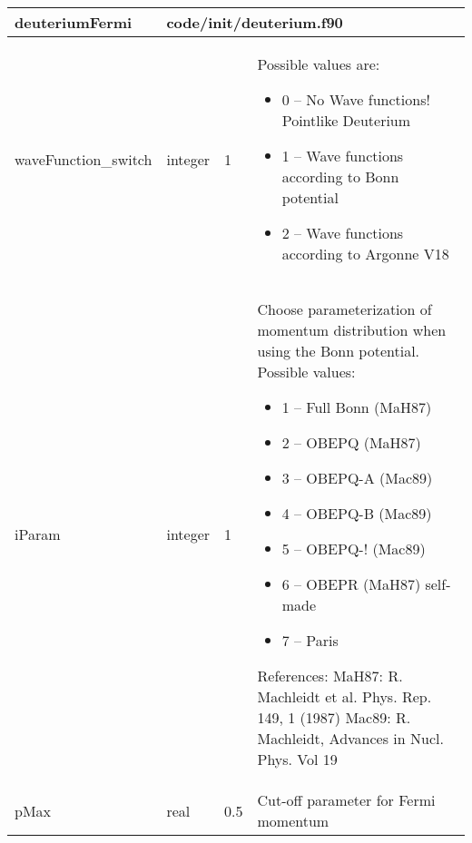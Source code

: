 \documentclass{article}
\begin{document}

\begin{longtable}{llll}
\toprule
\textbf{\large{deuteriumFermi}} & \multicolumn{3}{l}{\footnotesize{code/init/deuterium.f90}}\\*
\midrule
\endfirsthead
\midrule
\endhead
waveFunction\_switch & \begin{minipage}[t]{2cm}integer\end{minipage} & \begin{minipage}[t]{2cm}1\end{minipage} & \begin{minipage}[t]{12cm}Possible values are:\begin{itemize}\leftmargin0em\itemindent0pt\item 0 -- No Wave functions! Pointlike Deuterium\item 1 -- Wave functions according to Bonn potential\item 2 -- Wave functions according to Argonne V18\end{itemize}\end{minipage}\\*
\midrule
iParam & \begin{minipage}[t]{2cm}integer\end{minipage} & \begin{minipage}[t]{2cm}1\end{minipage} & \begin{minipage}[t]{12cm}Choose parameterization of momentum distribution when using the Bonn potential. Possible values:\begin{itemize}\leftmargin0em\itemindent0pt\item 1 --   Full Bonn  (MaH87)\item 2 --   OBEPQ      (MaH87)\item 3 --   OBEPQ-A    (Mac89)\item 4 --   OBEPQ-B    (Mac89)\item 5 --   OBEPQ-!    (Mac89)\item 6 --   OBEPR      (MaH87)  self-made\item 7 --   Paris\end{itemize} References: MaH87: R. Machleidt et al. Phys. Rep. 149, 1 (1987) Mac89: R. Machleidt, Advances in Nucl. Phys. Vol 19\end{minipage}\\*
\midrule
pMax & \begin{minipage}[t]{2cm}real\end{minipage} & \begin{minipage}[t]{2cm}0.5\end{minipage} & \begin{minipage}[t]{12cm}Cut-off parameter for Fermi momentum\end{minipage}\\*

\end{longtable}
\end{document}

